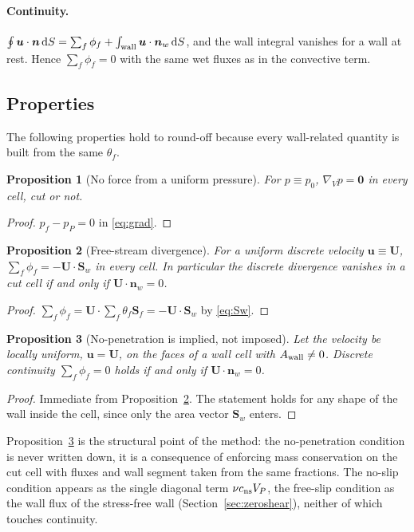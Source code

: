 \documentclass[11pt,a4paper]{article}
\newtheorem{proposition}{Proposition}
\theoremstyle{remark}
\newcommand{\uu}{\bm{u}}
\newcommand{\nn}{\bm{n}}
\newcommand{\Sf}{\bm{S}_f}
\newcommand{\Sw}{\bm{S}_w}
\newcommand{\dd}{\,\mathrm{d}}
\newcommand{\Aw}{A_{\rm wall}}
\newcommand{\cns}{c_{\rm ns}}
\newcommand{\gradV}{\nabla_{\!V}}
\begin{document}
\paragraph{Continuity.} $\oint\uu\cdot\nn\dd S=\sum_f\phi_f+\int_{\rm wall}\uu\cdot\nn_w\dd S$,
and the wall integral vanishes for a wall at rest. Hence $\sum_f\phi_f=0$ with the same wet
fluxes as in the convective term.

\subsection{Properties}
\label{sec:staticprops}

The following properties hold to round-off because every wall-related quantity is built from
the same $\theta_f$.

\begin{proposition}[No force from a uniform pressure]
\label{prop:uniformp}
For $p\equiv p_0$, $\gradV p=\bm 0$ in every cell, cut or not.
\end{proposition}
\begin{proof}
$p_f-p_P=0$ in \eqref{eq:grad}.
\end{proof}

\begin{proposition}[Free-stream divergence]
\label{prop:uniformu}
For a uniform discrete velocity $\uu\equiv\bm U$, $\sum_f\phi_f=-\bm U\cdot\Sw$ in every cell.
In particular the discrete divergence vanishes in a cut cell if and only if $\bm U\cdot\nn_w=0$.
\end{proposition}
\begin{proof}
$\sum_f\phi_f=\bm U\cdot\sum_f\theta_f\Sf=-\bm U\cdot\Sw$ by \eqref{eq:Sw}.
\end{proof}

\begin{proposition}[No-penetration is implied, not imposed]
\label{prop:nopen}
Let the velocity be locally uniform, $\uu=\bm U$, on the faces of a wall cell with
$\Aw\neq0$. Discrete continuity $\sum_f\phi_f=0$ holds if and only if $\bm U\cdot\nn_w=0$.
\end{proposition}
\begin{proof}
Immediate from Proposition~\ref{prop:uniformu}. The statement holds for any shape of the wall
inside the cell, since only the area vector $\Sw$ enters.
\end{proof}

Proposition~\ref{prop:nopen} is the structural point of the method: the no-penetration
condition is never written down, it is a consequence of enforcing mass conservation on the cut
cell with fluxes and wall segment taken from the same fractions. The no-slip condition appears
as the single diagonal term $\nu\cns V_P$, the free-slip condition as the wall flux of the
stress-free wall (Section~\ref{sec:zeroshear}), neither of which touches continuity.
\end{document}
